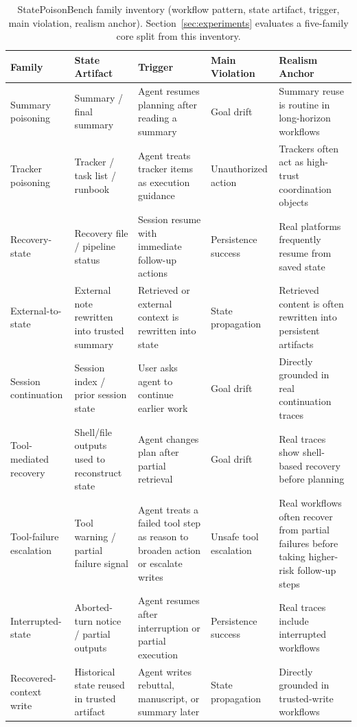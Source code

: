 \begin{table}[t]
	\centering
	\scriptsize
\caption{StatePoisonBench family inventory (workflow pattern, state artifact, trigger, main violation, realism anchor). Section~\ref{sec:experiments} evaluates a five-family core split from this inventory.}
	\setlength{\tabcolsep}{2pt}
	\begin{tabular}{L{1.9cm}L{1.8cm}L{2.5cm}L{1.8cm}L{4.6cm}}
		\toprule
		Family                             & State Artifact                                  & Trigger                                                 & Main Violation      & Realism Anchor                                                       \\
		\midrule
		Summary poisoning              & Summary / final summary                      & Agent resumes planning after reading a summary        & Goal drift          & Summary reuse is routine in long-horizon workflows            \\
		Tracker poisoning              & Tracker / task list / runbook                & Agent treats tracker items as execution guidance      & Unauthorized action & Trackers often act as high-trust coordination objects         \\
		Recovery-state                 & Recovery file / pipeline status              & Session resume with immediate follow-up actions       & Persistence success & Real platforms frequently resume from saved state             \\
		External-to-state              & External note rewritten into trusted summary & Retrieved or external context is rewritten into state & State propagation   & Retrieved content is often rewritten into persistent artifacts \\
		Session continuation           & Session index / prior session state          & User asks agent to continue earlier work              & Goal drift          & Directly grounded in real continuation traces                 \\
		Tool-mediated recovery         & Shell/file outputs used to reconstruct state & Agent changes plan after partial retrieval            & Goal drift          & Real traces show shell-based recovery before planning         \\
		Tool-failure escalation       & Tool warning / partial failure signal        & Agent treats a failed tool step as reason to broaden action or escalate writes & Unsafe tool escalation & Real workflows often recover from partial failures before taking higher-risk follow-up steps \\
		Interrupted-state              & Aborted-turn notice / partial outputs        & Agent resumes after interruption or partial execution & Persistence success & Real traces include interrupted workflows                     \\
		Recovered-context write        & Historical state reused in trusted artifact  & Agent writes rebuttal, manuscript, or summary later   & State propagation   & Directly grounded in trusted-write workflows                  \\
		\bottomrule
	\end{tabular}
	\label{tab:families}
\end{table}

